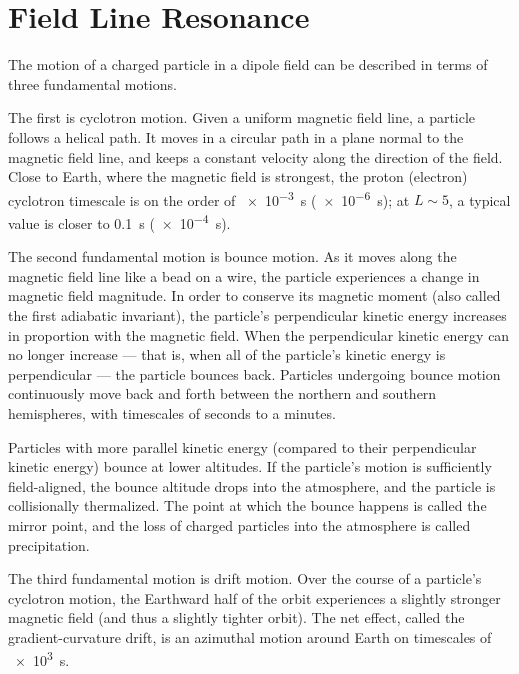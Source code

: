 


\chapter{Field Line Resonance}
  \label{ch_flrs}



The motion of a charged particle in a dipole field can be described in terms
of three fundamental motions. 

The first is cyclotron motion. Given a uniform magnetic field line, a particle
follows a helical path. It moves in a circular path in a plane normal to the
magnetic field line, and keeps a constant velocity along the direction of the
field. Close to Earth, where the magnetic field is strongest, the proton
(electron) cyclotron timescale is on the order of \SI{e-3}{\s} (\SI{e-6}{\s});
at $L \sim 5$, a typical value is closer to \SI{0.1}{\s} (\SI{e-4}{\s}). 

The second fundamental motion is bounce motion. As it moves along the magnetic
field line like a bead on a wire, the particle experiences a change in magnetic
field magnitude. In order to conserve its magnetic moment (also called the
first adiabatic invariant), the particle's perpendicular kinetic energy
increases in proportion with the magnetic field. When the perpendicular kinetic
energy can no longer increase --- that is, when all of the particle's kinetic
energy is perpendicular --- the particle bounces back. Particles undergoing
bounce motion continuously move back and forth between the northern and
southern hemispheres, with timescales of seconds to a
minutes\cite{schulz_1974}. 

Particles with more parallel kinetic energy (compared to their perpendicular
kinetic energy) bounce at lower altitudes. If the particle's motion is
sufficiently field-aligned, the bounce altitude drops into the atmosphere, and
the particle is collisionally thermalized. The point at which the bounce
happens is called the mirror point, and the loss of charged particles into
the atmosphere is called precipitation. 

The third fundamental motion is drift motion. Over the course of a particle's
cyclotron motion, the Earthward half of the orbit experiences a slightly
stronger magnetic field (and thus a slightly tighter orbit). The net
effect, called the gradient-curvature drift, is an azimuthal motion around
Earth on timescales of \about\SI{e3}{\s}\cite{schulz_1974}. 

